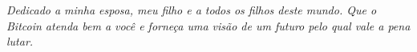 
\newpage \vspace*{8cm}
\thispagestyle{empty}
\begin{center}
  \Large \emph{ 
   Dedicado a minha esposa, meu filho e a todos os filhos deste mundo. Que o
   Bitcoin atenda bem a você e forneça uma visão de um futuro pelo qual vale a pena lutar.
  }
\end{center}
